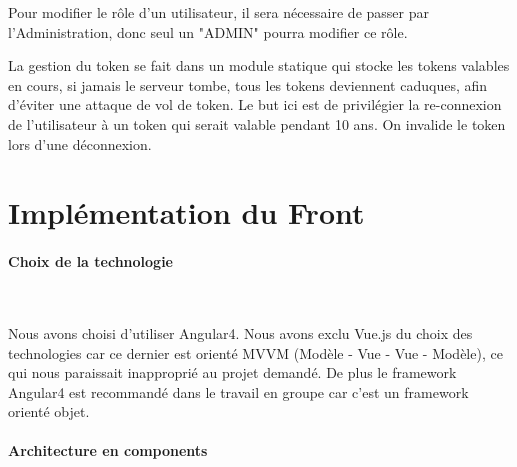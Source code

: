 \documentclass{article}
\begin{document}
  Pour modifier le rôle d'un utilisateur, il sera nécessaire de passer par l'Administration, donc seul un "ADMIN" pourra modifier ce rôle.

  La gestion du token se fait dans un module statique qui stocke les tokens valables en cours, si jamais le serveur tombe, tous les tokens deviennent caduques,
  afin d'éviter une attaque de vol de token. Le but ici est de privilégier la re-connexion de l'utilisateur à un token qui serait valable pendant 10 ans.
  On invalide le token lors d'une déconnexion.
  
\newpage
\section{Implémentation du Front}
  \paragraph{Choix de la technologie} \
  
  Nous avons choisi d'utiliser Angular4. Nous avons exclu Vue.js du choix des technologies
  car ce dernier est orienté MVVM (Modèle - Vue - Vue - Modèle), ce qui nous paraissait 
  inapproprié au projet demandé. De plus le framework Angular4 est recommandé dans le 
  travail en groupe car c'est un framework orienté objet.
  
  \paragraph{Architecture en components} \
  
\end{document}
